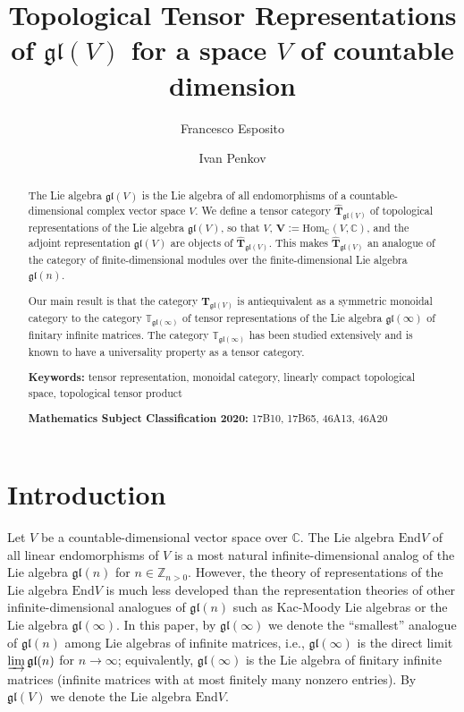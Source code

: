 \documentclass[12pt,reqno]{amsart}
\title{Topological Tensor Representations of $\mathfrak{gl}(V)$ for a space $V$ of countable dimension}
\author[Esposito]{Francesco Esposito}
\author[I. Penkov]{Ivan Penkov}
\newcommand{\CC}{\mathbb{C}}
\newcommand{\TT}{\mathbb{T}}
\theoremstyle{definition}
\theoremstyle{remark}
\begin{document}
	
	\maketitle
	
	\begin{abstract}
		
		The Lie algebra $ \mathfrak{gl}(V) $ is the Lie algebra of all endomorphisms of a countable-dimensional complex vector space $ V $. We define a tensor category $\widehat{\mathbf{T}}_{\mathfrak{gl}(V)}$ of topological representations of the Lie algebra $ \mathfrak{gl}(V) $, so that $ V $, $ \mathbf{V} := \mathrm{Hom}_{\CC}(V, \CC) $, and the adjoint representation $ \mathfrak{gl}(V) $ are objects of $\widehat{\mathbf{T}}_{\mathfrak{gl}(V)}$. This makes  $\widehat{\mathbf{T}}_{\mathfrak{gl}(V)}$ an analogue of the category of finite-dimensional modules over the finite-dimensional Lie algebra $\mathfrak{gl}(n)$.
		
		Our main result is that the category $\widehat{\mathbf{T}}_{\mathfrak{gl}(V)}$ is antiequivalent as a symmetric monoidal category to the category $\TT_{\mathfrak{gl}(\infty)}$ of tensor representations of the Lie algebra $\mathfrak{gl}(\infty)$ of finitary infinite matrices. The category $\TT_{\mathfrak{gl}(\infty)}$ has been studied extensively and is known to have a universality property as a tensor category. 
		
		\textbf{Keywords:} tensor representation, monoidal category, linearly compact topological space, topological tensor product
		
		\textbf{Mathematics Subject Classification 2020:} 17B10, 17B65, 46A13, 46A20
	\end{abstract}
	
	\section{Introduction}
	Let $V$ be a countable-dimensional vector space over $\CC$. The Lie algebra $\mathrm{End}V$ of all linear endomorphisms of $ V $ is a most natural infinite-dimensional analog of the Lie algebra $\mathfrak{gl}(n)$ for $n\in\mathbb{Z}_{n>0}$. However, the theory of representations of the Lie algebra $ \mathrm{End}V $ is much less developed than the representation theories of other infinite-dimensional analogues of $ \mathfrak{gl}(n) $ such as Kac-Moody Lie algebras or the Lie algebra $ \mathfrak{gl}(\infty) $. In this paper, by $ \mathfrak{gl}(\infty) $ we denote the ``smallest'' analogue of $ \mathfrak{gl}(n) $ among  Lie algebras of infinite matrices, i.e., $ \mathfrak{gl}(\infty) $ is the direct limit $ \varinjlim \mathfrak{gl}(n) $ for $ n\to\infty $; equivalently, $ \mathfrak{gl}(\infty) $ is the Lie algebra of finitary infinite matrices (infinite matrices with at most finitely many nonzero entries). By $ \mathfrak{gl}(V) $ we denote the Lie algebra $ \mathrm{End}V$.
	
\end{document}
